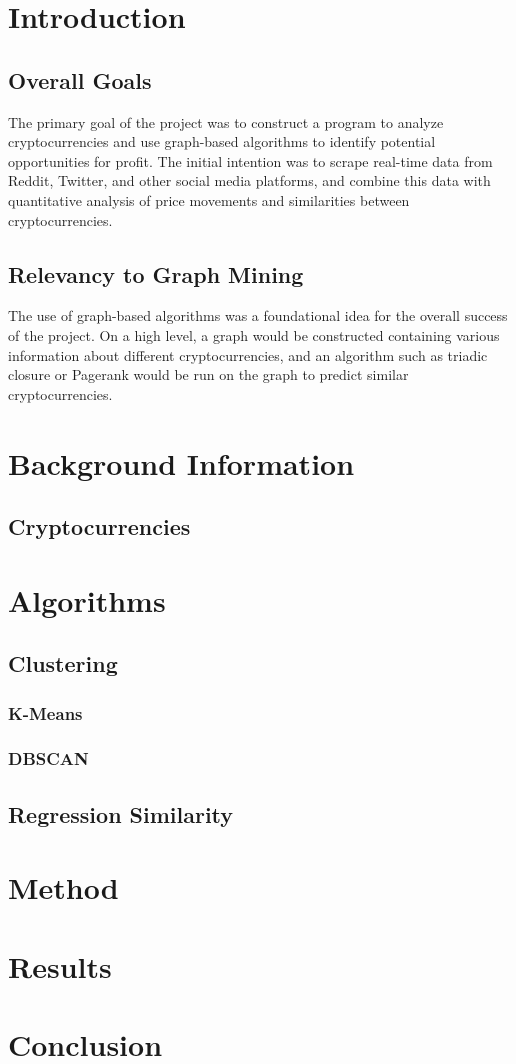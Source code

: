 \documentclass[11pt]{article}
\begin{document}
\section{Introduction}
\subsection{Overall Goals}
The primary goal of the project was to construct a program to analyze cryptocurrencies and use graph-based algorithms to identify potential opportunities for profit.  The initial intention was to scrape real-time data from Reddit, Twitter, and other social media platforms, and combine this data with quantitative analysis of price movements and similarities between cryptocurrencies.

\subsection{Relevancy to Graph Mining}
The use of graph-based algorithms was a foundational idea for the overall success of the project.  On a high level, a graph would be constructed containing various information about different cryptocurrencies, and an algorithm such as triadic closure or Pagerank would be run on the graph to predict similar cryptocurrencies.


\section{Background Information}
\subsection{Cryptocurrencies}


\section{Algorithms}
\subsection{Clustering}
\subsubsection{K-Means}
\subsubsection{DBSCAN}

\subsection{Regression Similarity}


\section{Method}


\section{Results}


\section{Conclusion}
\end{document}
